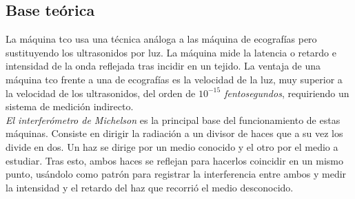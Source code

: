 \subsection{Base teórica}
La máquina \gls{tco} usa una técnica análoga a las máquina de
ecografías pero sustituyendo los ultrasonidos por luz. La máquina mide
la latencia o retardo e intensidad de la onda reflejada tras incidir
en un tejido. La ventaja de una máquina \gls{tco} frente a una de
ecografías es la velocidad de la luz, muy superior a la velocidad de
los ultrasonidos, del orden de \emph{$10^{-15}$ fentosegundos}, requiriendo un sistema de medición indirecto.\\
\emph{El interferómetro de Michelson} es la principal base del
funcionamiento de estas máquinas. Consiste en dirigir la radiación a
un divisor de haces que a su vez los divide en dos. Un haz se dirige
por un medio conocido y el otro por el medio a
estudiar. Tras esto, ambos haces se reflejan para hacerlos coincidir
en un mismo punto, usándolo como patrón para registrar la interferencia entre
ambos y medir la intensidad y el retardo del haz que recorrió el medio
desconocido.

